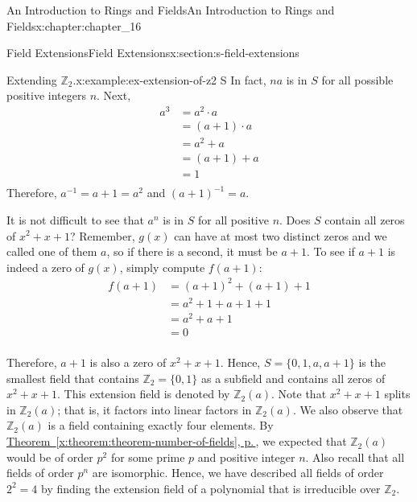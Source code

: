 \documentclass[twoside,10pt,]{book}
\newcommand{\xreffont}{\relax}
\numberwithin{equation}{section}
\begin{document}
\begin{chapterptx}{An Introduction to Rings and Fields}{}{An Introduction to Rings and Fields}{}{}{x:chapter:chapter_16}
\begin{sectionptx}{Field Extensions}{}{Field Extensions}{}{}{x:section:s-field-extensions}
\begin{example}{Extending \(\mathbb{Z}_2\).}{x:example:ex-extension-of-z2}
S\)   In fact, \(n a\) is in \(S\) for all possible positive integers \(n\).  Next,%
\begin{equation*}
\begin{split} a^3 & = a^2 \cdot  a \\
& = (a +1)\cdot a \\
&  = a^2+ a\\
&  = (a+1)+a\\
&  =1 \\
\end{split}
\end{equation*}
Therefore,  \(a^{-1}= a+1 = a^2\)   and \((a+1)^{-1}=a\).%
\par
It is not difficult to see that \(a^n\) is in \(S\) for all positive \(n\).  Does \(S\) contain all zeros of \(x^2 + x + 1\)? Remember, \(g(x)\) can have at most two distinct zeros and we called one of them \(a\), so if there is a second, it must be \(a + 1\). To see if \(a + 1\) is indeed a zero of \(g(x)\), simply compute \(f(a + 1)\):%
\begin{equation*}
\begin{split}
f(a+1) & = (a + 1)^2 + (a+1) + 1\\
&= a ^2 +1 + a+1+ 1 \\
& =a^2+a + 1\\
& =0\\
\end{split}
\end{equation*}
%
\par
Therefore, \(a + 1\) is also a zero of \(x^2 + x + 1\). Hence, \(S = \{0, 1, a, a + 1\}\) is the smallest field that contains \(\mathbb{Z}_2 = \{0, 1\}\) as a subfield and contains all zeros of \(x^2 + x + 1\). This extension field is denoted by \(\mathbb{Z}_2(a)\). Note that \(x^2 + x + 1\) splits in \(\mathbb{Z}_2(a)\); that is, it factors into linear factors in \(\mathbb{Z}_2(a)\). We also observe that \(\mathbb{Z}_2(a)\) is a field containing exactly four elements. By \hyperref[x:theorem:theorem-number-of-fields]{Theorem~{\xreffont\ref{x:theorem:theorem-number-of-fields}}, p.\,\pageref{x:theorem:theorem-number-of-fields}}, we expected that \(\mathbb{Z}_2(a)\) would be of order \(p^2\) for some prime \(p\) and positive integer \(n\). Also recall that all fields of order \(p^n\) are isomorphic. Hence, we have described all fields of order \(2^2 =4\) by finding the extension field of a polynomial that is irreducible over \(\mathbb{Z}_2\).%
\end{example}

\end{sectionptx}
\end{chapterptx}
\end{document}
